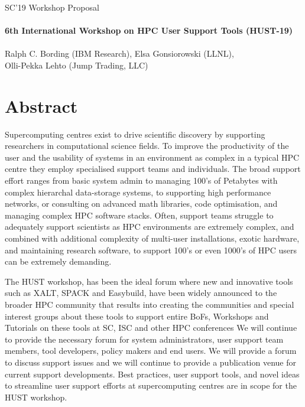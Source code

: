 \documentclass[a4paper,10pt]{article}
\begin{document}
\begin{center}
    \Large{SC'19 Workshop Proposal}\\~\\
    \large{\textbf{6th International Workshop on HPC User Support Tools (HUST-19)}}\\~\\
    \normalsize{Ralph C. Bording (IBM Research), Elsa Gonsiorowski (LLNL),\\
    Olli-Pekka Lehto (Jump Trading, LLC)}
\end{center}

\section*{Abstract}
\label{sec:abstract}

Supercomputing centres exist to drive scientific discovery by supporting researchers in computational science fields. 
To improve the productivity of the user and the usability of systems in an environment as complex in a typical HPC centre
they employ specialised support teams and individuals. The broad support effort ranges from basic system admin to 
managing 100's of Petabytes with complex hierarchal data-storage systems, to supporting high performance networks,  
or consulting on advanced math libraries, code optimisation, and managing complex HPC software stacks.  Often, 
support teams struggle to adequately support scientists as HPC environments are extremely complex, and combined 
with additional  complexity of multi-user installations, exotic hardware, and maintaining research software, to 
support 100's or even 1000's of HPC users can be extremely demanding.

The HUST workshop, has been the ideal forum where new and innovative tools such as XALT, SPACK and Easybuild, 
have been widely announced to the broader HPC community that results into creating the communities and special 
interest groups about these tools to support entire BoFs, Workshops and Tutorials on these tools at SC, ISC and 
other HPC conferences     We will continue to provide the necessary forum for system administrators, user support 
team members, tool developers, policy makers and end users. We will provide a forum to discuss support issues and 
we will continue to provide a publication venue for current support developments. Best practices, user support tools, 
and novel ideas to streamline user support efforts at supercomputing centres are in scope for the HUST workshop.
\end{document}
